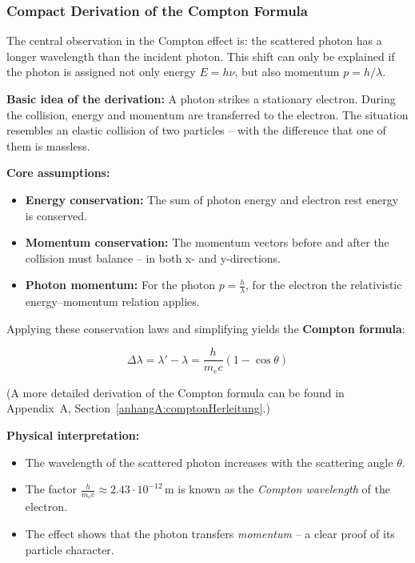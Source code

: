 \subsubsection{Compact Derivation of the Compton Formula}

The central observation in the Compton effect is: the scattered photon has a longer wavelength than the incident photon. This shift can only be explained if the photon is assigned not only energy \( E = h\nu \), but also momentum \( p = h/\lambda \).

\textbf{Basic idea of the derivation:}  
A photon strikes a stationary electron. During the collision, energy and momentum are transferred to the electron. The situation resembles an elastic collision of two particles – with the difference that one of them is massless.


\textbf{Core assumptions:}
\begin{itemize}
	\item \textbf{Energy conservation:} The sum of photon energy and electron rest energy is conserved.
	\item \textbf{Momentum conservation:} The momentum vectors before and after the collision must balance – in both x- and y-directions.
	\item \textbf{Photon momentum:} For the photon \( p = \frac{h}{\lambda} \), for the electron the relativistic energy–momentum relation applies.
\end{itemize}

Applying these conservation laws and simplifying yields the \textbf{Compton formula}:

\vspace{1em}
\begin{tcolorbox}[mathebox, title=Compton Formula]
	\label{box:comptonFormel}
	\small
	\[
	\Delta \lambda = \lambda' - \lambda = \frac{h}{m_e c}(1 - \cos \theta)
	\]
\end{tcolorbox}
\vspace{1em}
(A more detailed derivation of the Compton formula can be found in Appendix~A, Section~\ref{anhangA:comptonHerleitung}.) 

\textbf{Physical interpretation:}
\begin{itemize}
	\item The wavelength of the scattered photon increases with the scattering angle \( \theta \).
	\item The factor \( \frac{h}{m_e c} \approx 2.43 \cdot 10^{-12}\,\mathrm{m} \) is known as the \emph{Compton wavelength} of the electron.
	\item The effect shows that the photon transfers \emph{momentum} – a clear proof of its particle character.
\end{itemize}
